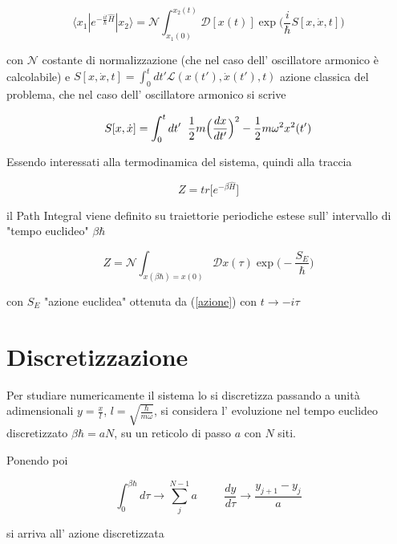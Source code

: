 \documentclass{article}
\begin{document}
\begin{equation}
    \langle x_1 | \displaystyle e^{-\frac{it}{\hbar}\hat{H}}|x_2\rangle = \displaystyle \mathcal{N}\int_{x_1(0)}^{x_2(t)} \mathcal{D}[x(t)] \exp\Bigg(\frac{i}{\hbar}S[x,\dot{x},t]\Bigg)
\end{equation}

con $\mathcal{N}$ costante di normalizzazione (che nel caso dell' oscillatore armonico è calcolabile) e $S[x,\dot{x},t] =\displaystyle \int_0^t dt' \mathcal{L}(x(t'),\dot{x}(t'),t)$ azione classica del problema, che nel caso dell' oscillatore armonico si scrive 

\begin{equation}
S[x,\dot{x}] = \displaystyle \int_0^t dt'\hspace{0.2cm} \frac{1}{2}m\Big(\frac{dx}{dt'}\Big)^2 - \frac{1}{2}m\omega^2x^2(t')
\label{azione}
\end{equation}

Essendo interessati alla termodinamica del sistema, quindi alla traccia 

\begin{equation}
Z = tr\Big[e^{-\beta\hat{H}}\Big]
\end{equation}

il Path Integral viene definito su traiettorie periodiche estese sull' intervallo di "tempo euclideo" $\beta\hbar$ 

\begin{equation}
\displaystyle Z = \mathcal{N} \int_{x(\beta\hbar)=x(0)} \mathcal{D}x(\tau)\exp\Big(-\frac{S_{E}}{\hbar}\Big)
\end{equation}

con $S_{E}$ "azione euclidea" ottenuta da (\ref{azione}) con $t\rightarrow-i\tau$

\section{Discretizzazione}
Per studiare numericamente il sistema lo si discretizza passando a unità adimensionali $y = \frac{x}{l}$, $l = \sqrt{\frac{\hbar}{m\omega}}$, si considera l' evoluzione nel tempo euclideo discretizzato $\beta\hbar = aN$, su un reticolo di passo $a$ con $N$ siti.

Ponendo poi 

$$\int_0^{\beta\hbar} d\tau \rightarrow \sum_j^{N-1}a \hspace{1cm} 
\frac{dy}{d\tau}\rightarrow \frac{y_{j+1}-y_j}{a}$$

si arriva all' azione discretizzata
\end{document}
